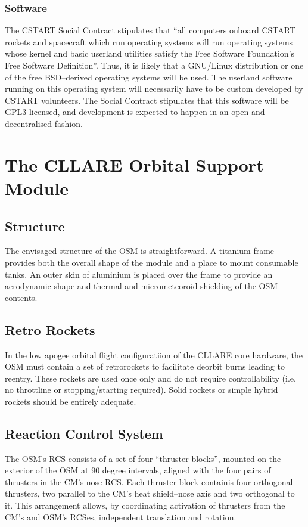 \documentclass{report}
\begin{document}
\subsubsection{Software}

The CSTART Social Contract stipulates that ``all computers onboard CSTART rockets and spacecraft which run operating systems will run operating systems whose kernel and basic userland utilities satisfy the Free Software Foundation's Free Software Definition''.  Thus, it is likely that a GNU/Linux distribution or one of the free BSD--derived operating systems will be used.  The userland software running on this operating system will necessarily have to be custom developed by CSTART volunteers.  The Social Contract stipulates that this software will be GPL3 licensed, and development is expected to happen in an open and decentralised fashion.

\section{The CLLARE Orbital Support Module}

\subsection{Structure}

The envisaged structure of the OSM is straightforward.  A titanium frame provides both the overall shape of the module and a place to mount consumable tanks.  An outer skin of aluminium is placed over the frame to provide an aerodynamic shape and thermal and micrometeoroid shielding of the OSM contents.

\subsection{Retro Rockets}

In the low apogee orbital flight configuratiion of the CLLARE core hardware, the OSM must contain a set of retrorockets to facilitate deorbit burns leading to reentry.  These rockets are used once only and do not require controllability (i.e. no throttline or stopping/starting required).  Solid rockets or simple hybrid rockets should be entirely adequate.

\subsection{Reaction Control System}

The OSM's RCS consists of a set of four ``thruster blocks'', mounted on the exterior of the OSM at 90 degree intervals, aligned with the four pairs of thrusters in the CM's nose RCS.  Each thruster block containis four orthogonal thrusters, two parallel to the CM's heat shield--nose axis and two orthogonal to it.  This arrangement allows, by coordinating activation of thrusters from the CM's and OSM's RCSes, independent translation and rotation.
\end{document}
